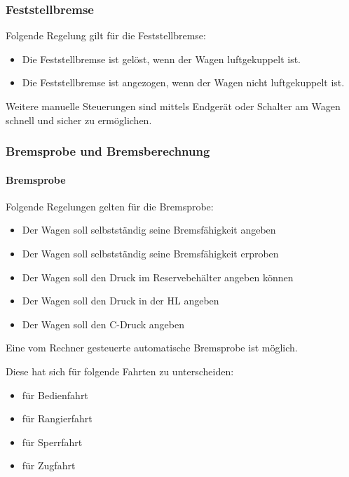 \subsubsection{Feststellbremse}
\begin{feat}
Folgende Regelung gilt für die Feststellbremse:
\begin{itemize}
    \item Die Feststellbremse ist gelöst, wenn der Wagen luftgekuppelt ist.
    \item Die Feststellbremse ist angezogen, wenn der Wagen nicht luftgekuppelt ist.
\end{itemize}
\end{feat}
\begin{rem} [zu Anf. 44]
Weitere manuelle Steuerungen sind mittels Endgerät oder \newline Schalter am Wagen schnell und sicher zu ermöglichen.
\end{rem}

\subsubsection{Bremsprobe und Bremsberechnung}
\paragraph{Bremsprobe}
\begin{feat}
Folgende Regelungen gelten für die Bremsprobe:
\begin{itemize}
    \item Der Wagen soll selbstständig seine Bremsfähigkeit angeben
    \item Der Wagen soll selbstständig seine Bremsfähigkeit erproben
    \item Der Wagen soll den Druck im Reservebehälter angeben können
    \item Der Wagen soll den Druck in der \acrshort{HL} angeben
    \item Der Wagen soll den C-Druck angeben
\end{itemize}
\end{feat}
\begin{feat}
Eine vom Rechner gesteuerte automatische Bremsprobe ist möglich.
\end{feat}
\begin{rem} [zu Anf. 46] 
Diese hat sich für folgende Fahrten zu unterscheiden:
\begin{itemize}
    \item für Bedienfahrt
    \item für Rangierfahrt
    \item für Sperrfahrt
    \item für Zugfahrt
\end{itemize}
\end{rem}

